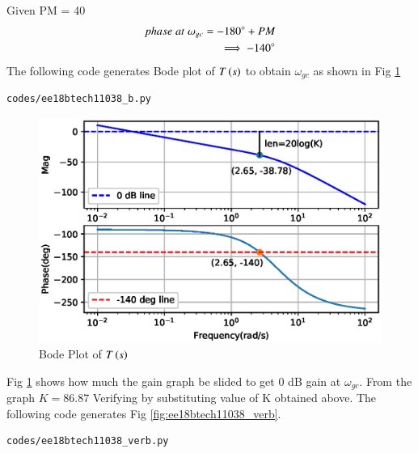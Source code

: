 Given PM = 40\degree
\begin{align}
    phase\; at\; \omega_{gc} = -180\degree + PM
    \\
    \implies -140\degree
\end{align}
The following code generates Bode plot of $T\left(s\right)$ to obtain $\omega_{gc}$ as shown in Fig \ref{fig:ee18btech11038_b}

\begin{lstlisting}
codes/ee18btech11038_b.py
\end{lstlisting}

\begin{figure}[!ht]
\centering
\includegraphics[width=\columnwidth]{./figs/ee18btech11038_b.eps}
\caption{Bode Plot of $T\left(s\right)$}
\label{fig:ee18btech11038_b}
\end{figure}
Fig \ref{fig:ee18btech11038_b} shows how much the gain graph be slided to get 0 dB gain at $\omega_{gc}$.
From the graph $K =86.87$ 
Verifying  by substituting value of K obtained above. 
The following code generates Fig \ref{fig:ee18btech11038_verb}.

\begin{lstlisting}
codes/ee18btech11038_verb.py
\end{lstlisting}

